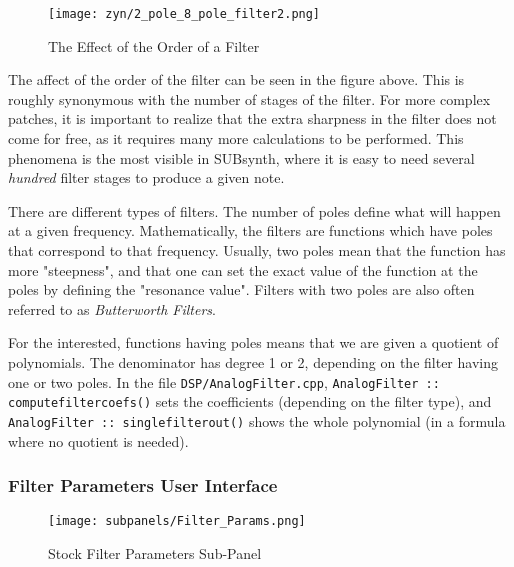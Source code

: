 \begin{figure}[H]
   \centering 
   \texttt{[image: zyn/2\_pole\_8\_pole\_filter2.png]}
   \caption[2 Pole vs. 8 Pole Filter]{The Effect of the Order of a Filter}
   \label{fig:2_pole_vs_8_pole_filter}
\end{figure}

   The affect of the order of the filter can be seen in the figure above.
   This is roughly synonymous with the number of stages of the filter. For
   more complex patches, it is important to realize that the extra sharpness
   in the filter does not come for free, as it requires many more
   calculations to be performed. This phenomena is the most visible in
   SUBsynth, where it is easy to need several \textsl{hundred} filter stages
   to produce a given note.

   There are different types of filters. The number of poles define what will
   happen at a given frequency. Mathematically, the filters are functions which
   have poles that correspond to that frequency. Usually, two poles mean that
   the function has more "steepness", and that one can set the exact value of
   the function at the poles by defining the "resonance value". Filters with
   two poles are also often referred to as \textsl{Butterworth Filters}.

   For the interested, functions having poles means that we are given a
   quotient of polynomials. The denominator has degree 1 or 2, depending on the
   filter having one or two poles. In the file \texttt{DSP/AnalogFilter.cpp},
   \texttt{AnalogFilter :: computefiltercoefs()} sets the coefficients
   (depending on the filter type), and
   \texttt{AnalogFilter :: singlefilterout()} shows
   the whole polynomial (in a formula where no quotient is needed).

\subsubsection{Filter Parameters User Interface}
\label{subsubsec:filter_parameters_user_interface}

\begin{figure}[H]
   \centering 
   \texttt{[image: subpanels/Filter\_Params.png]}
   \caption[Filter Parameters Sub-panel]{Stock Filter Parameters Sub-Panel}
   \label{fig:filter_parameters_subpanel} 
\end{figure}

